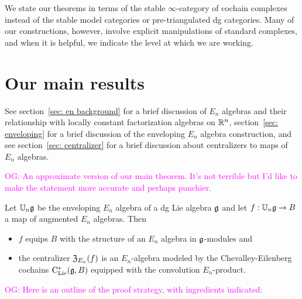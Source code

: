\documentclass[11pt]{amsart}
\numberwithin{equation}{section}
\def\owen{\textcolor{magenta}{OG: }\textcolor{magenta}}
\begin{document}
\begin{rmk}
We state our theorems in terms of the stable $\infty$-category of cochain complexes 
instead of the stable model categories or pre-triangulated dg categories. 
Many of our constructions, however, involve explicit manipulations of standard complexes, 
and when it is helpful, we indicate the level at which we are working.
\end{rmk}


\section{Our main results}

See section~\ref{sec: en background} for a brief discussion of $E_n$ algebras and their relationship with locally constant factorization algebras on $\mathbb R^n$, section~\ref{sec: enveloping} for a brief discussion of the enveloping $E_n$ algebra construction, and see section~\ref{sec: centralizer} 
for a brief discussion about centralizers to maps of $E_n$ algebras.

\owen{An approximate version of our main theorem. It's not terrible but I'd like to make the statement more accurate and perhaps punchier.}

\begin{thm}
\label{thm: centralizer}
Let $\mathbb U_n \mathfrak g$ be the enveloping $E_n$ algebra of a dg Lie algebra $\mathfrak g$ and let $f: \mathbb U_n \mathfrak g \to B$ a map of augmented $E_n$ algebras.
Then
\begin{itemize}
\item $f$ equips $B$ with the structure of an $E_n$ algebra in $\mathfrak g$-modules and
\item the centralizer ${\frak Z}_{E_n}(f)$ is an $E_n$-algebra modeled by the Chevalley-Eilenberg 
cochains ${\rm C}_{\rm Lie}^*(\mathfrak g, B)$ equipped with the convolution $E_n$-product.
\end{itemize}
\end{thm}

\owen{Here is an outline of the proof strategy, with ingredients indicated:}
\end{document}
